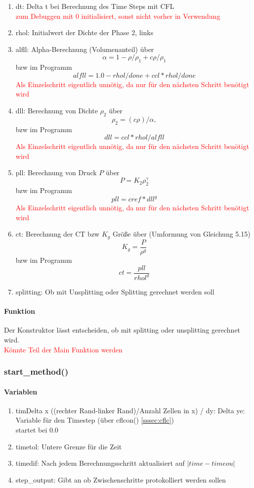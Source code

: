 \documentclass[12pt]{article}
\begin{document}
\begin{enumerate}
	\item dt: Delta t bei Berechnung des Time Steps mit CFL\\
	\textcolor{red}{zum Debuggen mit 0 initialisiert, sonst nicht vorher in Verwendung}
	\item rhol: Initialwert der Dichte der Phase 2, links
	\item alfll: Alpha-Berechnung (Volumenanteil) über 
	\[
	\alpha = 1 - \rho/\rho_1 + c\rho/\rho_1
	\]
	bzw im Programm
	\[
	alfll = 1.0 - rhol/done + ccl*rhol/done
	\]
	\textcolor{red}{Als Einzelschritt eigentlich unnötig, da nur für den nächsten Schritt benötigt wird}
	\item dll: Berechnung von Dichte $\rho_2$ über
	\[
	\rho_2 = (c\rho)/\alpha,
	\]
	bzw im Programm
	\[
	dll = ccl*rhol/alfll
	\]
	\textcolor{red}{Als Einzelschritt eigentlich unnötig, da nur für den nächsten Schritt benötigt wird}
	\item pll: Berechnung von Druck $P$ über
	\[
	P = K_2\rho_2^\gamma
	\]
	bzw im Programm
	\[
	pll = cref*dll^g
	\]
	\textcolor{red}{Als Einzelschritt eigentlich unnötig, da nur für den nächsten Schritt benötigt wird}
	\item ct: Berechnung der CT bzw $K_g$ Größe über (Umformung von Gleichung 5.15)
	\[
	K_g = \frac{P}{\rho^g}
	\]
	bzw im Programm
	\[
	ct = \frac{pll}{rhol^g}
	\]
	\item splitting: Ob mit Unsplitting oder Splitting gerechnet werden soll
\end{enumerate}
\paragraph{Funktion}
Der Konstruktor lässt entscheiden, ob mit splitting oder unsplitting gerechnet wird.\\
\textcolor{red}{Könnte Teil der Main Funktion werden}
\subsubsection{start\_method()} \label{sssec:start}
\paragraph{Variablen}
\begin{enumerate}
	\item timDelta x ((rechter Rand-linker Rand)/Anzahl Zellen in x) / dy: Delta ye: Variable für den Timestep (über cflcon() \ref{sssec:cflc})\\
	startet bei 0.0
	\item timetol: Untere Grenze für die Zeit
	\item timedif: Nach jedem Berechnungsschritt aktualisiert auf $|time-timeou|$
	\item step\_output: Gibt an ob Zwischenschritte protokolliert werden sollen
\end{enumerate}
\end{document}
